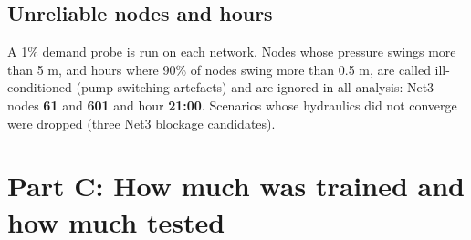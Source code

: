 \documentclass[11pt,a4paper]{article}
\begin{document}
\subsection{Unreliable nodes and hours}\label{sec:ignored}
A 1\% demand probe is run on each network. Nodes whose pressure swings more than 5 m, and hours where 90\% of nodes swing more than 0.5 m, are called ill-conditioned (pump-switching artefacts) and are ignored in all analysis: Net3 nodes \textbf{61} and \textbf{601} and hour \textbf{21:00}. Scenarios whose hydraulics did not converge were dropped (three Net3 blockage candidates).

\section*{Part C: How much was trained and how much tested}
\end{document}

